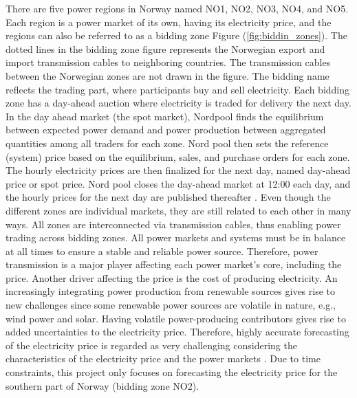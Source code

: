 \documentclass
[twocolumn,
secnumarabic,
nobibnotes,
aps,
prl,
reprint,
groupedaddress,
amsmath,
amssymb,
]{revtex4-2}
\begin{document}
There are five power regions in Norway named NO1, NO2, NO3, NO4, and NO5. Each region is a power market of its own, having its electricity price, and the regions can also be referred to as a bidding zone Figure (\ref{fig:biddin_zones}). The dotted lines in the bidding zone figure represents the Norwegian export and import transmission cables to neighboring countries. The transmission cables between the Norwegian zones are not drawn in the figure. The bidding name reflects the trading part, where participants buy and sell electricity. Each bidding zone has a day-ahead auction where electricity is traded for delivery the next day. In the day ahead market (the spot market), Nordpool finds the equilibrium between expected power demand and power production between aggregated quantities among all traders for each zone. Nord pool then sets the reference (system) price based on the equilibrium, sales, and purchase orders for each zone. The hourly electricity prices are then finalized for the next day, named day-ahead price or spot price. Nord pool closes the day-ahead market at 12:00 each day, and the hourly prices for the next day are published thereafter \cite{nordpool}. Even though the different zones are individual markets, they are still related to each other in many ways. All zones are interconnected via transmission cables, thus enabling power trading across bidding zones. All power markets and systems must be in balance at all times to ensure a stable and reliable power source. Therefore, power transmission is a major player affecting each power market's core, including the price. Another driver affecting the price is the cost of producing electricity. An increasingly integrating power production from renewable sources gives rise to new challenges since some renewable power sources are volatile in nature, e.g., wind power and solar. Having volatile power-producing contributors gives rise to added uncertainties to the electricity price. Therefore, highly accurate forecasting of the electricity price is regarded as very challenging considering the characteristics of the electricity price and the power markets \cite{li_day-ahead_2021, nogales_forecasting_2002,bunn_forecasting_2000}. Due to time constraints, this project only focuses on forecasting the electricity price for the southern part of Norway (bidding zone NO2). 
\end{document}
